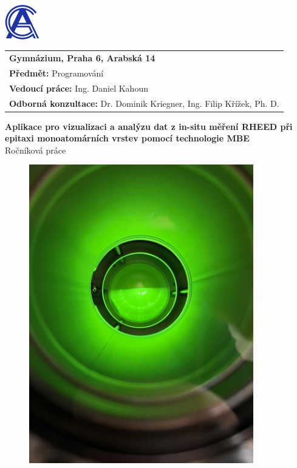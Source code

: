 \documentclass{article}
\begin{document}
	\thispagestyle{empty}
	
	\begin{flushleft}
		\includegraphics[width=1.5cm]{logo.png}
		\begin{tabular}[b]{@{}p{}}
			\large\textbf{Gymnázium, Praha 6, Arabská 14}\\
			\textbf{Předmět:} Programování\\
			\textbf{Vedoucí práce:} Ing. Daniel Kahoun\\
			\textbf{Odborná konzultace:} Dr. Dominik Kriegner, Ing. Filip Křížek, Ph. D. 
		\end{tabular}
	\end{flushleft}
	
	\vspace*{\fill}
	
	\begin{center}
		\vspace{1cm}
		{\Huge\textbf{Aplikace pro vizualizaci a analýzu dat z in-situ měření RHEED při epitaxi monoatomárních vrstev pomocí technologie MBE}}\\
		\vspace{0.5cm}
		Ročníková práce
		\vspace{0.5cm}
	\end{center}
	
	\begin{figure}[h]
		\centering
		\includegraphics[width=0.87\textwidth]{title.png}
	\end{figure}
	
\end{document}
